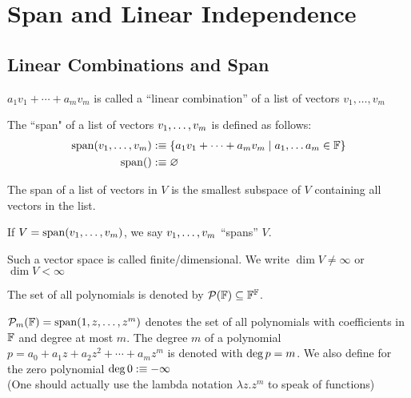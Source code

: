 \section{Span and Linear Independence}
\subsection{Linear Combinations and Span}

\setcounter{thm}{1}
\begin{mydef} 
  $a_1 v_1 + \cdots + a_m v_m$ is called a ``linear combination'' of a list of vectors $v_1, \dots, v_m$
\end{mydef}

\setcounter{thm}{3}
\begin{mydef} 
	The ``span" of a list of vectors $v_1, \dots, v_m$ is defined as follows:
  \begin{equation}
    \begin{aligned}
      \operatorname{span} (v_1, \dots, v_m) &:\equiv \{a_1 v_1 + \cdots + a_m v_m \mid a_1, \dots a_m \in \mathbb{F} \}\\
      \operatorname{span} ( ) &:\equiv \varnothing
    \end{aligned}
  \end{equation}
\end{mydef}

\setcounter{thm}{5}
\begin{thm} 
  The  span of a list of vectors in $V$ is the smallest subspace of $V$ containing all vectors in the list.
\end{thm}

\begin{mydef} 
  If $V=\operatorname{span} (v_1, \dots, v_m)$, we say $v_1, \dots, v_m$ ``spans'' $V$.
\end{mydef}

\setcounter{thm}{8}
\begin{mydef} 
  Such a vector space is called finite\-/dimensional. We write $\dim V \neq \infty$ or $\dim V < \infty$
\end{mydef}

\begin{mydef}
  The set of all polynomials is denoted by $\mathcal{P} (\mathbb{F}) \subseteq \mathbb{F}^{\mathbb{F}}$.
\end{mydef}
\begin{mydef}
  $\mathcal{P}_m (\mathbb{F} )=\operatorname{span} (1,z,\dots,z^m)$ denotes the set of all polynomials with coefficients in $\mathbb{F}$ and degree at most $m$. The degree $m$ of a polynomial $p=a_0+a_1z+a_2z^2+\cdots+a_mz^m$ is denoted with ${\operatorname{deg} \,} p=m$.
  We also define for the zero polynomial ${\operatorname{deg} \,} 0 : \equiv -\infty$ \\
  (One should actually use the lambda notation $\lambda z.z^m$ to speak of functions)
\end{mydef}

